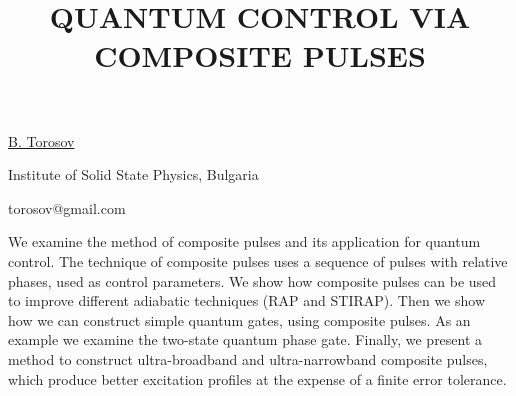\title{QUANTUM CONTROL VIA COMPOSITE PULSES}

\underline{B. Torosov}

{\normalsize{
\vspace{-4mm} Institute of Solid State Physics, Bulgaria


\email torosov@gmail.com}}

We examine the method of composite pulses and its application for quantum control. The technique
of composite pulses uses a sequence of pulses with relative phases, used as control parameters. We show how composite pulses can be used to improve different adiabatic techniques (RAP and
STIRAP). Then we show how we can construct simple quantum gates, using composite pulses. As an
example we examine the two-state quantum phase gate. Finally, we present a method to construct
ultra-broadband and ultra-narrowband composite pulses, which produce better excitation profiles
at the expense of a finite error tolerance.

\vspace{\baselineskip}
